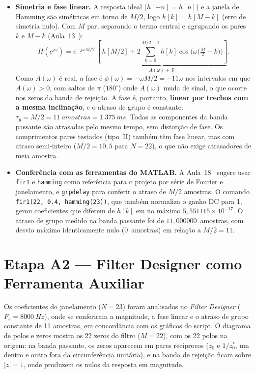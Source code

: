 \documentclass[11pt,a4paper]{article}
\newcommand{\MetricaAErroFirI}{5{,}551115\times 10^{-17}}
\newcommand{\MetricaAAtrasoGdMedio}{11{,}000000}
\newcommand{\MetricaAAtrasoGdDesvio}{0}
\begin{document}
\begin{itemize}[leftmargin=1.5em, itemsep=3pt]
    \item \textbf{Simetria e fase linear.} A resposta ideal ($h[-n] = h[n]$) e a janela de Hamming são simétricas em torno de $M/2$, logo $h[k] = h[M-k]$ (erro de simetria nulo). Com $M$ par, separando o termo central e agrupando os pares $k$ e $M - k$ (Aula~13~\cite{aula13}):
    \begin{equation}
        H(e^{j\omega}) = e^{-j\omega M/2}\, \underbrace{\left[\, h[M/2] + 2\sum_{k=0}^{M/2-1} h[k]\cos\!\Big(\omega\big(\tfrac{M}{2} - k\big)\Big) \right]}_{A(\omega)\,\in\,\mathbb{R}}.
    \end{equation}
    Como $A(\omega)$ é real, a fase é $\phi(\omega) = -\omega M/2 = -11\omega$ nos intervalos em que $A(\omega) > 0$, com saltos de $\pi$ ($180^\circ$) onde $A(\omega)$ muda de sinal, o que ocorre nos zeros da banda de rejeição. A fase é, portanto, \textbf{linear por trechos com a mesma inclinação}, e o atraso de grupo é constante: $\tau_g = M/2 = \SI{11}{amostras} = \SI{1,375}{ms}$. Todas as componentes da banda passante são atrasadas pelo mesmo tempo, sem distorção de fase. Os comprimentos pares testados (tipo~II) também têm fase linear, mas com atraso semi-inteiro ($M/2 = 10,5$ para $N = 22$), o que não exige atrasadores de meia amostra.

    \item \textbf{Conferência com as ferramentas do MATLAB.} A Aula~18~\cite{aula18} sugere usar \texttt{fir1} e \texttt{hamming} como referência para o projeto por série de Fourier e janelamento, e \texttt{grpdelay} para conferir o atraso de $M/2$ amostras. O comando \texttt{fir1(22, 0.4, hamming(23))}, que também normaliza o ganho DC para 1, gerou coeficientes que diferem de $h[k]$ em no máximo $\MetricaAErroFirI$. O atraso de grupo medido na banda passante foi de $\MetricaAAtrasoGdMedio$~amostras, com desvio máximo identicamente nulo ($\MetricaAAtrasoGdDesvio$~amostras) em relação a $M/2 = 11$.
\end{itemize}

\FloatBarrier
\section{Etapa A2 — Filter Designer como Ferramenta Auxiliar}

Os coeficientes do janelamento ($N = 23$) foram analisados no \textit{Filter Designer} ($F_s = \SI{8000}{Hz}$), onde se conferiram a magnitude, a fase linear e o atraso de grupo constante de 11 amostras, em concordância com os gráficos do script. O diagrama de polos e zeros mostra os 22 zeros do filtro ($M = 22$), com os 22 polos na origem: na banda passante, os zeros aparecem em pares recíprocos ($z_0$ e $1/z_0^*$, um dentro e outro fora da circunferência unitária), e na banda de rejeição ficam sobre $|z| = 1$, onde produzem os nulos da resposta em magnitude.
\end{document}
